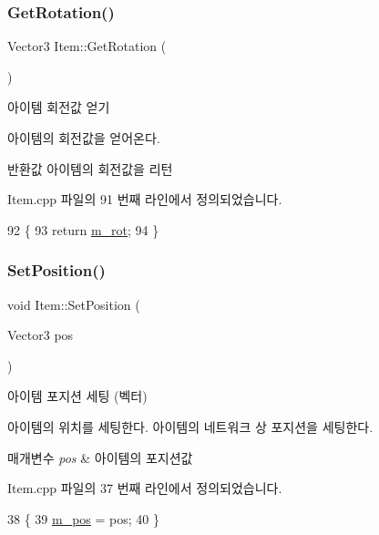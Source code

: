 \subsubsection{\texorpdfstring{Get\+Rotation()}{GetRotation()}}
{\footnotesize\ttfamily Vector3 Item\+::\+Get\+Rotation (\begin{DoxyParamCaption}{ }\end{DoxyParamCaption})}



아이템 회전값 얻기 

아이템의 회전값을 얻어온다.

\begin{DoxyReturn}{반환값}
아이템의 회전값을 리턴 
\end{DoxyReturn}


Item.\+cpp 파일의 91 번째 라인에서 정의되었습니다.


\begin{DoxyCode}
92 \{
93     \textcolor{keywordflow}{return} \hyperlink{class_item_a8442ba52568d84d584117ed8e4f11883}{m\_rot};
94 \}
\end{DoxyCode}
\mbox{\label{class_item_ae98790cd9fb0ef12e3bfc8149db4453f}} 
\subsubsection{\texorpdfstring{Set\+Position()}{SetPosition()}\hspace{0.1cm}{\footnotesize\ttfamily [1/2]}}
{\footnotesize\ttfamily void Item\+::\+Set\+Position (\begin{DoxyParamCaption}\item[{Vector3}]{pos }\end{DoxyParamCaption})}



아이템 포지션 세팅 (벡터) 

아이템의 위치를 세팅한다.  아이템의 네트워크 상 포지션을 세팅한다.


\begin{DoxyParams}{매개변수}
{\em pos} & 아이템의 포지션값 \\
\hline
\end{DoxyParams}


Item.\+cpp 파일의 37 번째 라인에서 정의되었습니다.


\begin{DoxyCode}
38 \{
39     \hyperlink{class_item_a6b35031bbc368a4d04c2298f1b094973}{m\_pos} = pos;
40 \}
\end{DoxyCode}
\mbox{\label{class_item_ab4bb5f402c4ab8829c70d02c44128faa}} 
